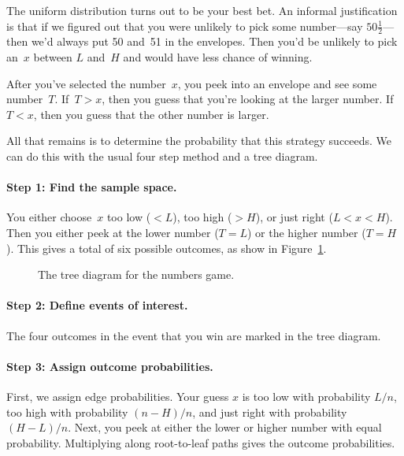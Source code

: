 The uniform distribution turns out to be your best bet.  An informal
justification is that if we figured out that you were unlikely to pick
some number---say $50\frac{1}{2}$---then we'd always put 50 and~51 in
the envelopes.  Then you'd be unlikely to pick an~$x$ between $L$
and~$H$ and would have less chance of winning.

After you've selected the number~$x$, you peek into an envelope and
see some number~$T$.  If~$T > x$, then you guess that you're looking
at the larger number.  If~$T < x$, then you guess that the other
number is larger.

All that remains is to determine the probability that this strategy
succeeds.  We can do this with the usual four step method and a tree
diagram.

\paragraph{Step 1: Find the sample space.}

You either choose~$x$ too low ($< L$), too high ($> H$), or just right
($L < x < H$).  Then you either peek at the lower number ($T = L$) or
the higher number ($T = H$).  This gives a total of six possible
outcomes, as show in Figure~\ref{fig:16F4}.

\begin{figure}[h]



\caption{The tree diagram for the numbers game.}

\label{fig:16F4}

\end{figure}

\paragraph{Step 2: Define events of interest.}

The four outcomes in the event that you win are marked in the tree
diagram.

\paragraph{Step 3: Assign outcome probabilities.}

First, we assign edge probabilities.  Your guess $x$ is too low with
probability $L/n$, too high with probability $(n-H)/n$, and just right
with probability $(H-L)/n$.  Next, you peek at either the lower or
higher number with equal probability.  Multiplying along root-to-leaf
paths gives the outcome probabilities.

